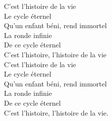 \documentclass{novel}
\begin{document}
C'est l'histoire de la vie \\
Le cycle éternel \\
Qu'un enfant béni, rend immortel \\

La ronde infinie \\
De ce cycle éternel \\
C'est l'histoire, l'histoire de la vie \\

C'est l'histoire de la vie \\
Le cycle éternel \\
Qu'un enfant béni, rend immortel \\

La ronde infinie \\
De ce cycle éternel \\
C'est l'histoire, l'histoire de la vie.
\end{document}

